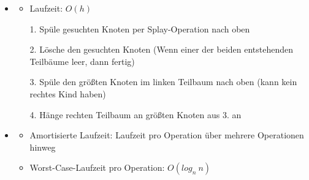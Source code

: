 \documentclass[
    12pt,
    a4paper,
    ngerman,
    color=3b,%
    marginpar=false,
    colorback=false,
    leqno,
]{tudaexercise}
\begin{document}
\begin{itemize}
        \item {}
            \begin{itemize}
                \item Laufzeit: $O(h)$
                \item[1.] Spüle gesuchten Knoten per Splay-Operation nach oben
                \item[2.] Lösche den gesuchten Knoten (Wenn einer der beiden entstehenden Teilbäume leer, dann fertig)
                \item[3.] Spüle den größten Knoten im linken Teilbaum nach oben (kann kein rechtes Kind haben)
                \item[4.] Hänge rechten Teilbaum an größten Knoten aus 3. an   
            \end{itemize}
        
        \item {}
            \begin{itemize}
                \item Amortisierte Laufzeit: Laufzeit pro Operation über mehrere Operationen hinweg
                \item Worst-Case-Laufzeit pro Operation: $O(log_n~n)$
            \end{itemize}
    \end{itemize}
    \clearpage
\end{document}
